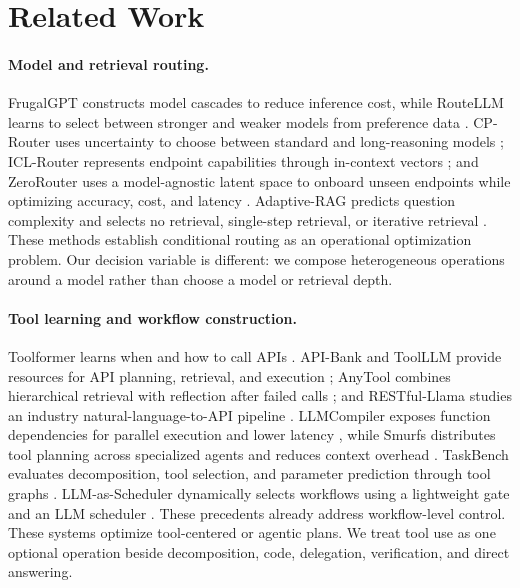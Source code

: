 \documentclass[letterpaper]{article} %
\begin{document}
\section{Related Work}

\paragraph{Model and retrieval routing.}
FrugalGPT constructs model cascades to reduce inference cost, while RouteLLM learns to select between stronger and weaker models from preference data \citep{chen2024frugalgpt,ong2025routellm}. CP-Router uses uncertainty to choose between standard and long-reasoning models \citep{su2026cprouter}; ICL-Router represents endpoint capabilities through in-context vectors \citep{wang2026iclrouter}; and ZeroRouter uses a model-agnostic latent space to onboard unseen endpoints while optimizing accuracy, cost, and latency \citep{yan2026zerorouter}. Adaptive-RAG predicts question complexity and selects no retrieval, single-step retrieval, or iterative retrieval \citep{jeong2024adaptiverag}. These methods establish conditional routing as an operational optimization problem. Our decision variable is different: we compose heterogeneous operations around a model rather than choose a model or retrieval depth.

\paragraph{Tool learning and workflow construction.}
Toolformer learns when and how to call APIs \citep{schick2023toolformer}. API-Bank and ToolLLM provide resources for API planning, retrieval, and execution \citep{li2023apibank,qin2024toolllm}; AnyTool combines hierarchical retrieval with reflection after failed calls \citep{du2024anytool}; and RESTful-Llama studies an industry natural-language-to-API pipeline \citep{xu2024restful}. LLMCompiler exposes function dependencies for parallel execution and lower latency \citep{kim2024llmcompiler}, while Smurfs distributes tool planning across specialized agents and reduces context overhead \citep{chen2025smurfs}. TaskBench evaluates decomposition, tool selection, and parameter prediction through tool graphs \citep{shen2024taskbench}. LLM-as-Scheduler dynamically selects workflows using a lightweight gate and an LLM scheduler \citep{xiang2026scheduler}. These precedents already address workflow-level control. These systems optimize tool-centered or agentic plans. We treat tool use as one optional operation beside decomposition, code, delegation, verification, and direct answering.
\end{document}
